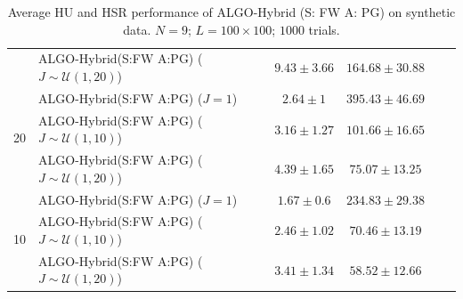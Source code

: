 \begin{table}[h]
\begin{adjustbox}{max width=\textwidth}
\begin{tabular}{|c|l|c|c|c|c|}
                    & ALGO-Hybrid(S:FW A:PG) ($J\sim\mathcal{U}(1,20)$) & $9.43     \pm 3.66$   & $164.68   \pm 30.88$ \tabularnewline \cline{1-4}
\multirow{3}{*}{20} & ALGO-Hybrid(S:FW A:PG) ($J=1$)                    & $2.64     \pm  1$     & $395.43   \pm 46.69$ \tabularnewline
                    & ALGO-Hybrid(S:FW A:PG) ($J\sim\mathcal{U}(1,10)$) & $3.16     \pm 1.27$   & $101.66   \pm 16.65$ \tabularnewline
                    & ALGO-Hybrid(S:FW A:PG) ($J\sim\mathcal{U}(1,20)$) & $4.39     \pm 1.65$   & $75.07    \pm 13.25$ \tabularnewline \cline{1-4}
\multirow{3}{*}{10} & ALGO-Hybrid(S:FW A:PG) ($J=1$)                    & $1.67     \pm 0.6$    & $234.83   \pm 29.38$ \tabularnewline
                    & ALGO-Hybrid(S:FW A:PG) ($J\sim\mathcal{U}(1,10)$) & $2.46     \pm 1.02$   & $70.46    \pm 13.19$ \tabularnewline
                    & ALGO-Hybrid(S:FW A:PG) ($J\sim\mathcal{U}(1,20)$) & $3.41     \pm 1.34$   & $58.52    \pm 12.66$ \tabularnewline \cline{1-4}
\end{tabular}
\end{adjustbox}
\caption{Average HU and HSR performance of ALGO-Hybrid (S: FW A: PG) on synthetic data.
         $N = 9$; $L = 100 \times 100$; $1000$ trials.}
\label{table:results_full_HYBRID_FW_PG_MO9}
\end{table}

\newpage


